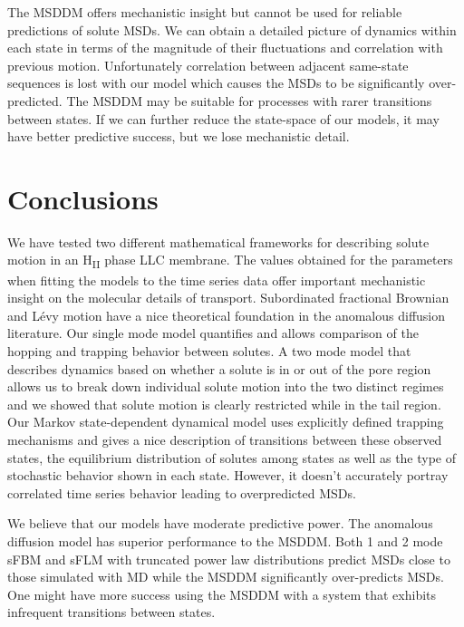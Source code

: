 \documentclass{article}
\begin{document}
  The MSDDM offers mechanistic insight but cannot be used for reliable predictions
  of solute MSDs. We can obtain a detailed picture of dynamics within each state in
  terms of the magnitude of their fluctuations and correlation with previous 
  motion. Unfortunately correlation between adjacent same-state sequences is lost
  with our model which causes the MSDs to be significantly over-predicted. The MSDDM
  may be suitable for processes with rarer transitions between states. If we can 
  further reduce the state-space of our models, it may have better predictive success,
  but we lose mechanistic detail.
  

  \section{Conclusions}
  
  We have tested two different mathematical frameworks for describing solute
  motion in an H\textsubscript{II} phase LLC membrane. The values obtained for
  the parameters when fitting the models to the time series data offer important
  mechanistic insight on the molecular details of transport.
  Subordinated fractional Brownian and L\'evy motion have a nice theoretical 
  foundation in the anomalous diffusion literature. Our single mode model
  quantifies and allows comparison of the hopping and trapping behavior 
  between solutes. A two mode model that describes dynamics based on whether
  a solute is in or out of the pore region allows us to break down individual
  solute motion into the two distinct regimes and we showed that solute motion is
  clearly restricted while in the tail region. Our Markov state-dependent dynamical
  model uses explicitly defined trapping mechanisms and gives a nice description 
  of transitions between these observed states, the equilibrium distribution of 
  solutes among states as well as the type of stochastic behavior shown in each 
  state. However, it doesn't accurately portray correlated time series behavior
  leading to overpredicted MSDs.
  
  We believe that our models have moderate predictive power. 
  The anomalous
  diffusion model has superior performance to the MSDDM. Both 1 and 2 mode 
  sFBM and sFLM with truncated power law distributions predict MSDs close 
  to those simulated with MD while the MSDDM significantly over-predicts MSDs.
  One might have more success using the MSDDM with a system that exhibits
  infrequent transitions between states.
\end{document}
